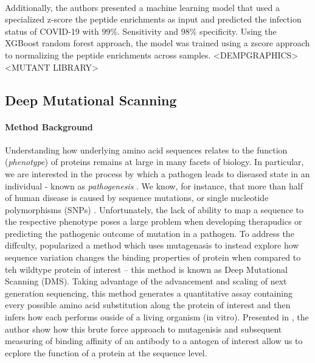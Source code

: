 \documentclass{article}
\begin{document}
~

Additionally, the authors presented a machine learning model that used a specialized z-score the peptide enrichments as input and predicted the infection status of COVID-19 with $99\%$. Sensitivity and $98\%$ specificity.
Using the XGBoost random forest approach, the model was trained using a zscore approach to normalizing the peptide enrichments across samples.
<DEMPGRAPHICS>
<MUTANT LIBRARY>

\subsection*{Deep Mutational Scanning}

\paragraph{Method Background} Understanding how underlying amino acid sequences relates to the function (\textit{phenotype}) of proteins remains at large in many facets of biology.
In particular, we are interested in the process by which a pathogen leads to diseased state in an individual - known as \textit{pathogenesis} \citep{Araya2011, Fowler2014, Weile2018}.
We know, for instance, that more than half of human disease is caused by sequence mutations, or single nucleotide polymorphisms (SNPs) \citep{Stenson2009}.
Unfortunately, the lack of ability to map a sequence to the respective phenotype poses a large problem when developing therapudics or predicting the pathogenic outcome of mutation in a pathogen.
To address the diffculty, \citep{Araya2011} popularized a method which uses mutagenasis to instead explore how sequence variation changes the binding properties of protein when compared to teh wildtype protein of interest -- this method is known as Deep Mutational Scanning (DMS).
Taking advantage of the advancement and scaling of next generation sequencing, this method generates a quantitative assay containing every possible amino acid substitution along the protein of interest and then infers how each performs ouside of a living organism (in vitro).
Presented in \citet{Adams2016}, the author show how this brute force approach to mutagenisis and subsequent measuring of binding affinity of an antibody to a antogen of interest allow us to ecplore the function of a protein at the sequence level.

~
\end{document}
